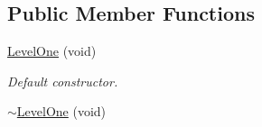 \subsection*{Public Member Functions}
\begin{DoxyCompactItemize}
\item 
\hypertarget{class_level_one_ae669d5df528238d51a6656f21dc96ddf}{\hyperlink{class_level_one_ae669d5df528238d51a6656f21dc96ddf}{Level\-One} (void)}\label{class_level_one_ae669d5df528238d51a6656f21dc96ddf}

\begin{DoxyCompactList}\small\item\em Default constructor. \end{DoxyCompactList}\item 
\hypertarget{class_level_one_a6491e07ba25448aa7b294c906bebc26b}{\hyperlink{class_level_one_a6491e07ba25448aa7b294c906bebc26b}{$\sim$\-Level\-One} (void)}\label{class_level_one_a6491e07ba25448aa7b294c906bebc26b}


\end{DoxyCompactItemize}
